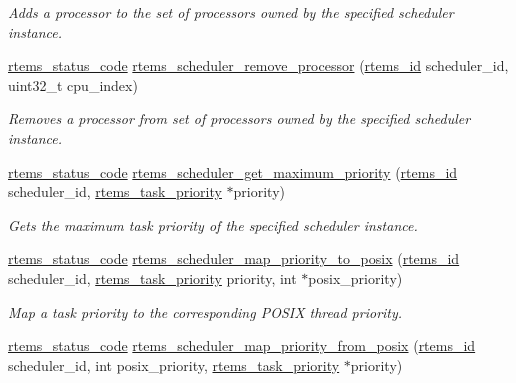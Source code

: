 \begin{DoxyCompactItemize}
\begin{DoxyCompactList}\small\item\em Adds a processor to the set of processors owned by the specified scheduler instance. \end{DoxyCompactList}\item 
\mbox{\hyperlink{group__ClassicStatus_ga545d41846817eaba6143d52ee4d9e9fe}{rtems\+\_\+status\+\_\+code}} \mbox{\hyperlink{group__ClassicTasks_ga033f8f1ec58d5e0f91dbf69f0486b441}{rtems\+\_\+scheduler\+\_\+remove\+\_\+processor}} (\mbox{\hyperlink{group__ClassicTasks_gab20892b814dced7dd4e5b9bf42becd57}{rtems\+\_\+id}} scheduler\+\_\+id, uint32\+\_\+t cpu\+\_\+index)
\begin{DoxyCompactList}\small\item\em Removes a processor from set of processors owned by the specified scheduler instance. \end{DoxyCompactList}\item 
\mbox{\hyperlink{group__ClassicStatus_ga545d41846817eaba6143d52ee4d9e9fe}{rtems\+\_\+status\+\_\+code}} \mbox{\hyperlink{group__ClassicTasks_gabc603f953ab1ee64fa66e092a30a9274}{rtems\+\_\+scheduler\+\_\+get\+\_\+maximum\+\_\+priority}} (\mbox{\hyperlink{group__ClassicTasks_gab20892b814dced7dd4e5b9bf42becd57}{rtems\+\_\+id}} scheduler\+\_\+id, \mbox{\hyperlink{group__ClassicTasks_gaa80a0c0938307d1e99d0eb5fee765b47}{rtems\+\_\+task\+\_\+priority}} $\ast$priority)
\begin{DoxyCompactList}\small\item\em Gets the maximum task priority of the specified scheduler instance. \end{DoxyCompactList}\item 
\mbox{\hyperlink{group__ClassicStatus_ga545d41846817eaba6143d52ee4d9e9fe}{rtems\+\_\+status\+\_\+code}} \mbox{\hyperlink{group__ClassicTasks_ga875f450e05e528d678c06243dbfbda17}{rtems\+\_\+scheduler\+\_\+map\+\_\+priority\+\_\+to\+\_\+posix}} (\mbox{\hyperlink{group__ClassicTasks_gab20892b814dced7dd4e5b9bf42becd57}{rtems\+\_\+id}} scheduler\+\_\+id, \mbox{\hyperlink{group__ClassicTasks_gaa80a0c0938307d1e99d0eb5fee765b47}{rtems\+\_\+task\+\_\+priority}} priority, int $\ast$posix\+\_\+priority)
\begin{DoxyCompactList}\small\item\em Map a task priority to the corresponding P\+O\+S\+IX thread priority. \end{DoxyCompactList}\item 
\mbox{\hyperlink{group__ClassicStatus_ga545d41846817eaba6143d52ee4d9e9fe}{rtems\+\_\+status\+\_\+code}} \mbox{\hyperlink{group__ClassicTasks_ga52b4ea4c1b8bb3a657e75f1c69e24741}{rtems\+\_\+scheduler\+\_\+map\+\_\+priority\+\_\+from\+\_\+posix}} (\mbox{\hyperlink{group__ClassicTasks_gab20892b814dced7dd4e5b9bf42becd57}{rtems\+\_\+id}} scheduler\+\_\+id, int posix\+\_\+priority, \mbox{\hyperlink{group__ClassicTasks_gaa80a0c0938307d1e99d0eb5fee765b47}{rtems\+\_\+task\+\_\+priority}} $\ast$priority)

\end{DoxyCompactItemize}
